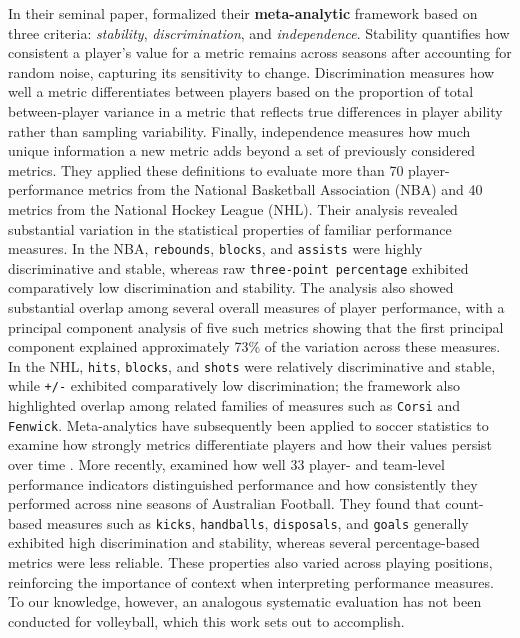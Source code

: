 \documentclass[
  12pt]{article}
\begin{document}
In their seminal paper, \citet{franks_meta-analytics_2016} formalized
their \textbf{meta-analytic} framework based on three criteria:
\emph{stability}, \emph{discrimination}, and \emph{independence}.
Stability quantifies how consistent a player's value for a metric
remains across seasons after accounting for random noise, capturing its
sensitivity to change. Discrimination measures how well a metric
differentiates between players based on the proportion of total
between-player variance in a metric that reflects true differences in
player ability rather than sampling variability. Finally, independence
measures how much unique information a new metric adds beyond a set of
previously considered metrics. They applied these definitions to
evaluate more than 70 player-performance metrics from the National
Basketball Association (NBA) and 40 metrics from the National Hockey
League (NHL). Their analysis revealed substantial variation in the
statistical properties of familiar performance measures. In the NBA,
\texttt{rebounds}, \texttt{blocks}, and \texttt{assists} were highly
discriminative and stable, whereas raw \texttt{three-point\ percentage}
exhibited comparatively low discrimination and stability. The analysis
also showed substantial overlap among several overall measures of player
performance, with a principal component analysis of five such metrics
showing that the first principal component explained approximately 73\%
of the variation across these measures. In the NHL, \texttt{hits},
\texttt{blocks}, and \texttt{shots} were relatively discriminative and
stable, while \texttt{+/-} exhibited comparatively low discrimination;
the framework also highlighted overlap among related families of
measures such as \texttt{Corsi} and \texttt{Fenwick}. Meta-analytics
have subsequently been applied to soccer statistics to examine how
strongly metrics differentiate players and how their values persist over
time \citep{elhabr_tonys_2023}. More recently,
\citet{matteo_understanding_2026} examined how well 33 player- and
team-level performance indicators distinguished performance and how
consistently they performed across nine seasons of Australian Football.
They found that count-based measures such as \texttt{kicks},
\texttt{handballs}, \texttt{disposals}, and \texttt{goals} generally
exhibited high discrimination and stability, whereas several
percentage-based metrics were less reliable. These properties also
varied across playing positions, reinforcing the importance of context
when interpreting performance measures. To our knowledge, however, an
analogous systematic evaluation has not been conducted for volleyball,
which this work sets out to accomplish.
\end{document}
